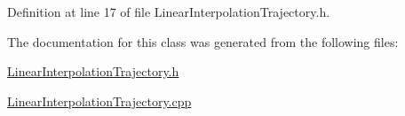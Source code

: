 Definition at line 17 of file Linear\+Interpolation\+Trajectory.\+h.



The documentation for this class was generated from the following files\+:\begin{DoxyCompactItemize}
\item 
\hyperlink{LinearInterpolationTrajectory_8h}{Linear\+Interpolation\+Trajectory.\+h}\item 
\hyperlink{LinearInterpolationTrajectory_8cpp}{Linear\+Interpolation\+Trajectory.\+cpp}\end{DoxyCompactItemize}

